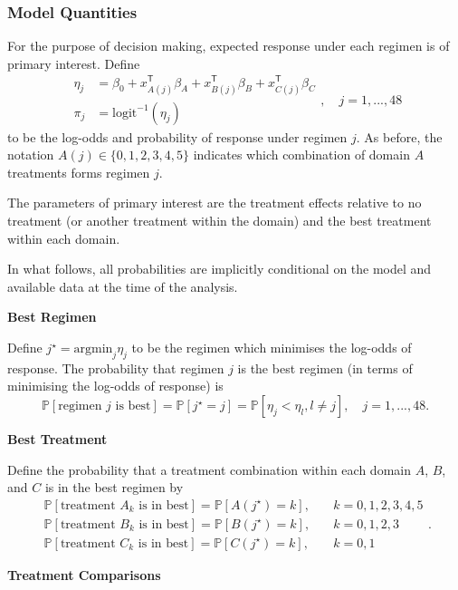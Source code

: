 \documentclass[
]{article}
\begin{document}
\hypertarget{model-quantities}{%
\subsubsection{Model Quantities}\label{model-quantities}}

For the purpose of decision making, expected response under each regimen is of primary interest.
Define
\[
\begin{aligned}
\eta_j &= \beta_0 + x_{A(j)}^{\mathsf{T}}\beta_A + x_{B(j)}^{\mathsf{T}}\beta_B + x_{C(j)}^{\mathsf{T}}\beta_C \\
\pi_j &= \text{logit}^{-1}(\eta_j)
\end{aligned},\quad j=1,...,48
\]
to be the log-odds and probability of response under regimen \(j\).
As before, the notation \(A(j)\in\{0,1,2,3,4,5\}\) indicates which combination of domain \(A\) treatments forms regimen \(j\).

The parameters of primary interest are the treatment effects relative to no treatment (or another treatment within the domain) and the best treatment within each domain.

In what follows, all probabilities are implicitly conditional on the model and available data at the time of the analysis.

\textbf{Best Regimen}

Define \(j^\star = \text{argmin}_j \eta_j\) to be the regimen which minimises the log-odds of response.
The probability that regimen \(j\) is the best regimen (in terms of minimising the log-odds of response) is
\[
\mathbb P[\text{regimen }j\text{ is best}] = \mathbb P[j^\star = j] = \mathbb P[\eta_j < \eta_{l}, l\ne j],\quad j=1,...,48.
\]

\textbf{Best Treatment}

Define the probability that a treatment combination within each domain \(A\), \(B\), and \(C\) is in the best regimen by
\[
\begin{aligned}
\mathbb P[\text{treatment }A_k\text{ is in best}] = \mathbb P[A(j^\star)=k],&\quad k=0,1,2,3,4,5 \\
\mathbb P[\text{treatment }B_k\text{ is in best}] = \mathbb P[B(j^\star)=k],&\quad k=0,1,2,3 \\
\mathbb P[\text{treatment }C_k\text{ is in best}] = \mathbb P[C(j^\star)=k],&\quad k=0,1
\end{aligned}.
\]

\textbf{Treatment Comparisons}
\end{document}
